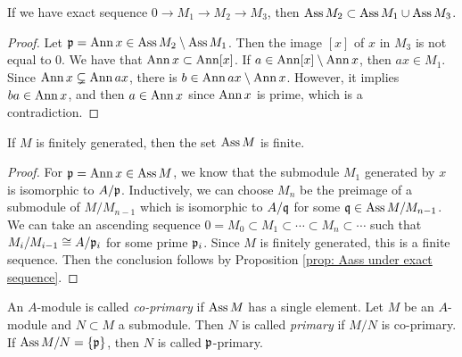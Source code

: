         \begin{proposition}\label{prop: Aass under exact sequence}
            If we have exact sequence $0 \to M_1 \to M_2 \to M_3$, then $\operatorname{Ass} M_2 \subset \operatorname{Ass} M_1 \cup \operatorname{Ass} M_3$.
        \end{proposition}
        \begin{proof}
            Let ${\mathfrak{p}} = \operatorname{Ann} x \in \operatorname{Ass} M_2 \setminus \operatorname{Ass} M_1$.
            Then the image $[x]$ of $x$ in $M_3$ is not equal to $0$.
            We have that $\operatorname{Ann} x \subset \operatorname{Ann} [x]$.
            If $a \in \operatorname{Ann} [x] \setminus \operatorname{Ann} x$, then $ax \in M_1$.
            Since $\operatorname{Ann} x \subsetneq \operatorname{Ann} ax$, there is $b \in \operatorname{Ann} ax \setminus \operatorname{Ann} x$.
            However, it implies $ba \in \operatorname{Ann} x$, and then $a \in \operatorname{Ann} x$ since $\operatorname{Ann} x$ is prime, which is a contradiction.
        \end{proof}

        \begin{corollary}\label{cor: Ass is finite}
            If $M$ is finitely generated, then the set $\operatorname{Ass} M$ is finite.
        \end{corollary}
        \begin{proof}
            For ${\mathfrak{p}} = \operatorname{Ann} x \in \operatorname{Ass} M$, we know that the submodule $M_1$ generated by $x$ is isomorphic to $A/{\mathfrak{p}}$.
            Inductively, we can choose $M_n$ be the preimage of a submodule of $M/M_{n-1}$ which is isomorphic to $A/{\mathfrak{q}}$ for some ${\mathfrak{q}} \in \operatorname{Ass} M/M_{n-1}$.
            We can take an ascending sequence $0 = M_0 \subset M_1 \subset \cdots \subset M_n \subset \cdots$ such that $M_i/M_{i-1} \cong A/{\mathfrak{p}}_i$ for some prime ${\mathfrak{p}}_i$.
            Since $M$ is finitely generated, this is a finite sequence.
            Then the conclusion follows by Proposition \ref{prop: Aass under exact sequence}.
        \end{proof}

        \begin{definition}\label{def: co-primary and primary}
            An $A$-module is called \textit{co-primary} if $\operatorname{Ass} M$ has a single element.
            Let $M$ be an $A$-module and $N \subset M$ a submodule.
            Then $N$ is called \textit{primary} if $M/N$ is co-primary.
            If $\operatorname{Ass} M/N = \{{\mathfrak{p}}\}$, then $N$ is called ${\mathfrak{p}}$-primary.
        \end{definition}

